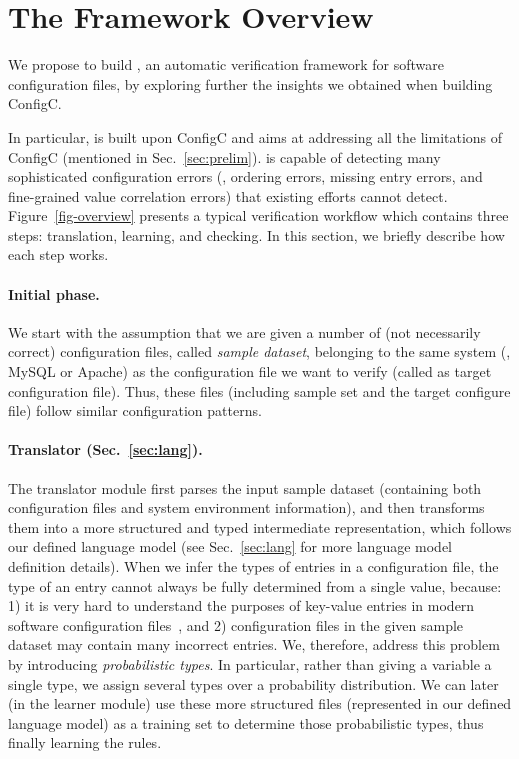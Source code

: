 
\section{The \app Framework Overview}
\label{sec:overview}

We propose to build \app, an automatic verification framework for 
software configuration files, by exploring further the insights we 
obtained when building ConfigC. 


In particular, \app is built upon ConfigC and aims at addressing
all the limitations of ConfigC (mentioned in Sec.~\ref{sec:prelim}).
\app is capable of detecting many sophisticated 
configuration errors (\eg, ordering errors, missing entry errors,
and fine-grained value correlation errors) that existing
efforts cannot detect. 
Figure~\ref{fig-overview} presents
a typical \app verification workflow which contains three steps:
translation, learning, and checking. In this section, we briefly
describe how each step works.

\paragraph{Initial phase.}
We start with the assumption 
that we are given a number of (not necessarily correct) 
configuration files, called {\em sample dataset}, 
belonging to the same system (\eg, MySQL or Apache)
as the configuration file we want to verify (called as target
configuration file). Thus, these files (including sample set
and the target configure file) follow similar configuration patterns.

\paragraph{Translator (Sec.~\ref{sec:lang}).}
The translator module first parses the input sample dataset 
(containing both configuration files and system environment
information), and then transforms them into a more structured
and typed intermediate representation, which follows
our defined language model (see Sec.~\ref{sec:lang} 
for more language model definition details).
When we infer the types of entries in a configuration file, 
the type of an entry cannot always be fully determined from 
a single value, because: 1) it is very hard to understand
the purposes of key-value entries in modern
software configuration files~\cite{xu15hey},
and 2) configuration files in the given sample dataset may contain 
many incorrect entries.
We, therefore, address this problem 
by introducing {\em probabilistic types}.
In particular, rather than giving a variable a single type, 
we assign several types over a probability distribution. 
We can later (in the learner module) use these more structured files
(represented in our defined language model) 
as a training set to determine those probabilistic types, 
thus finally learning the rules. 

